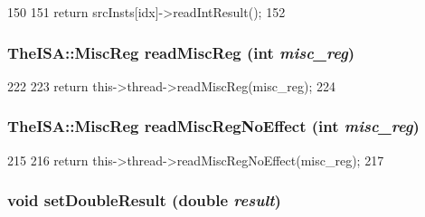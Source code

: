 \begin{DoxyCode}
150     {
151         return srcInsts[idx]->readIntResult();
152     }
\end{DoxyCode}
\hypertarget{classOzoneDynInst_a34ce48319c94bd2802d790e830357b9c}{
\subsubsection[{readMiscReg}]{\setlength{\rightskip}{0pt plus 5cm}TheISA::MiscReg readMiscReg (int {\em misc\_\-reg})}}
\label{classOzoneDynInst_a34ce48319c94bd2802d790e830357b9c}



\begin{DoxyCode}
222 {
223     return this->thread->readMiscReg(misc_reg);
224 }
\end{DoxyCode}
\hypertarget{classOzoneDynInst_a1a9e07a956ef5a2611fe7cd590872097}{
\subsubsection[{readMiscRegNoEffect}]{\setlength{\rightskip}{0pt plus 5cm}TheISA::MiscReg readMiscRegNoEffect (int {\em misc\_\-reg})}}
\label{classOzoneDynInst_a1a9e07a956ef5a2611fe7cd590872097}



\begin{DoxyCode}
215 {
216     return this->thread->readMiscRegNoEffect(misc_reg);
217 }
\end{DoxyCode}
\hypertarget{classOzoneDynInst_ab7c8bc58a7b7f5d3987308e2346af4ed}{
\subsubsection[{setDoubleResult}]{\setlength{\rightskip}{0pt plus 5cm}void setDoubleResult (double {\em result})}}
\label{classOzoneDynInst_ab7c8bc58a7b7f5d3987308e2346af4ed}



